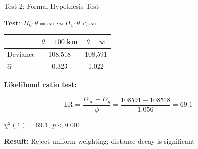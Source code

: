 \documentclass[aspectratio=169]{beamer}
\begin{document}
\begin{frame}{Test 2: Formal Hypothesis Test}

\textbf{Test:} $H_0: \theta = \infty$ vs $H_1: \theta < \infty$

\vspace{1em}

\begin{center}
\begin{tabular}{lcc}
\toprule
& $\theta = 100$ km & $\theta = \infty$ \\
\midrule
Deviance & 108,518 & 108,591 \\
$\hat{\alpha}$ & 0.323 & 1.022 \\
\bottomrule
\end{tabular}
\end{center}

\vspace{1em}

\textbf{Likelihood ratio test:}

\begin{equation*}
\text{LR} = \frac{D_{\infty} - D_{\hat{\theta}}}{\phi} = \frac{108591 - 108518}{1.056} = 69.1
\end{equation*}

\vspace{0.5em}

\begin{center}
$\chi^2(1) = 69.1$, \quad $p < 0.001$
\end{center}

\vspace{0.5em}

\textbf{Result:} Reject uniform weighting; distance decay is significant

\end{frame}
\end{document}
